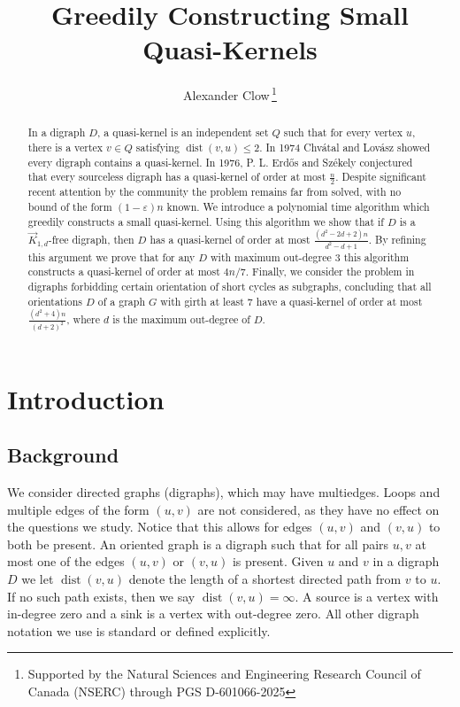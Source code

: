 \documentclass[12pt]{article}
\title{Greedily Constructing Small Quasi-Kernels}
\author[1]{Alexander Clow\,\thanks{Supported by the Natural Sciences and Engineering Research Council of Canada (NSERC) through PGS D-601066-2025}}
\affil[1]{ \small{Department of Mathematics, Simon Fraser University}}
\date{}
\theoremstyle{definition}
\def\epsilon{\varepsilon}
\DeclareMathOperator{\dist}{dist}
\begin{document}
\maketitle

\begin{abstract}

    In a digraph $D$,
    a quasi-kernel is an independent set $Q$ such that for every vertex $u$, there is a vertex $v \in Q$ satisfying $\dist(v,u)\leq 2$.
    In 1974 Chv\'atal and Lov\'asz showed every digraph contains a quasi-kernel.
    In 1976, P. L. Erd\H{o}s and Sz\'ekely conjectured that every sourceless digraph has a quasi-kernel of order at most $\frac{n}{2}$.
    Despite significant recent attention by the community the problem remains far from solved, with no bound of the form $(1-\epsilon)n$ known.
    We introduce a polynomial time algorithm which greedily constructs a small quasi-kernel.
    Using this algorithm we show that if $D$ is a $\Vec{K}_{1,d}$-free digraph, then $D$ has a 
    quasi-kernel of order at most $\frac{(d^2 - 2d + 2)n}{d^2-d+1}$.
    By refining this argument we prove that for any $D$ with maximum out-degree $3$ this algorithm constructs a 
    quasi-kernel of order at most ${4n}/{7}$.
    Finally,
    we consider the problem in digraphs forbidding certain orientation of short cycles
    as subgraphs,
    concluding that all orientations $D$ of a graph $G$ with girth at least $7$
    have a quasi-kernel of order at most $\frac{(d^2+4)n}{(d+2)^2}$, where
    $d$ is the maximum out-degree of $D$.
\end{abstract}

\section{Introduction}

\subsection{Background}

We consider directed graphs (digraphs), which may have multiedges. 
Loops and multiple edges of the form $(u,v)$ are not considered, as they have no effect on the questions we study.
Notice that this allows for edges $(u,v)$ and $(v,u)$ to both be present.
An oriented graph is a digraph such that for all pairs $u,v$
at most one of the edges $(u,v)$ or $(v,u)$ is present.
Given $u$ and $v$ in a digraph $D$ we let $\dist(v,u)$ denote the length of a shortest directed path from $v$ to $u$.
If no such path exists, then we say $\dist(v,u) = \infty$.
A source is a vertex with in-degree zero and a sink is a vertex with out-degree zero.
All other digraph notation we use is standard or defined explicitly.
\end{document}
